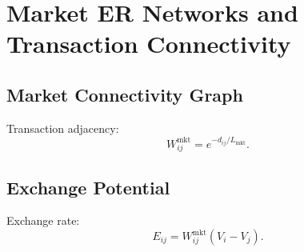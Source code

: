 \chapter{Market ER Networks and Transaction Connectivity}

\section{Market Connectivity Graph}
Transaction adjacency:
\[
W^{\mathrm{mkt}}_{ij} = e^{-d_{ij}/L_{\mathrm{mkt}}}.
\]

\section{Exchange Potential}
Exchange rate:
\[
E_{ij} = W^{\mathrm{mkt}}_{ij}(V_i - V_j).
\]

